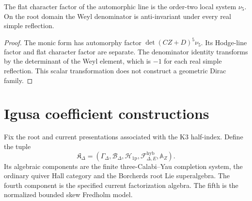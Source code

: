 \begin{corollary}
The flat character factor of the automorphic line is the order-two local system $\nu_5$.
On the root domain the Weyl denominator is anti-invariant under every real simple reflection.
\end{corollary}
\begin{proof}
The monic form has automorphy factor $\det(CZ+D)^5\nu_5$.
Its Hodge-line factor and flat character factor are separate.
The denominator identity transforms by the determinant of the Weyl element, which is $-1$ for each real simple reflection.
This scalar transformation does not construct a geometric Dirac family.
\end{proof}

\chapter{Igusa coefficient constructions}
\begin{definition}
Fix the root and current presentations associated with the K3 half-index. Define the tuple
\[
 \mathfrak K_{\Delta}=
 \left(
 \Gamma_\Delta,
 \mathcal B_\Delta,
 \mathcal H_{\mathrm{1p}},
 \mathcal F^{\mathrm{hyb}}_{\Delta,E},
 \mathbb A_Z
 \right).
\]
Its algebraic components are the finite three-Calabi--Yau completion system, the ordinary quiver Hall category and the Borcherds root Lie superalgebra. The fourth component is the specified current factorization algebra. The fifth is the normalized bounded skew Fredholm model.
\end{definition}

